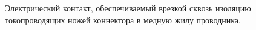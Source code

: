 Электрический контакт, обеспечиваемый врезкой сквозь
изоляцию токопроводящих ножей коннектора в медную жилу проводника.